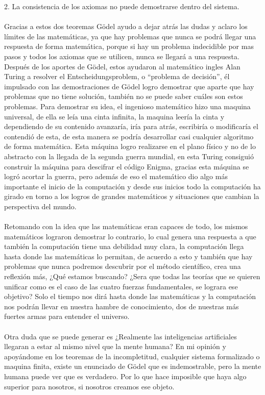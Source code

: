 \documentclass{article}
\begin{document}
2.	La consistencia de los axiomas no puede demostrarse dentro del sistema.\citep{3}\\\\
Gracias a estos dos teoremas Gödel ayudo a dejar atrás las dudas y aclaro los límites de las matemáticas, ya que hay problemas que nunca se podrá llegar una respuesta de forma matemática, porque si hay un problema indecidible por mas pasos y todos los axiomas que se utilicen, nunca se llegará a una respuesta.
Después de los aportes de Gödel, estos ayudaron al matemático ingles Alan Turing a resolver el Entscheidungsproblem, o “problema de decisión”, él impulsado con las demostraciones de Gödel logro demostrar que aparte que hay problemas que no tiene solución, también no se puede saber cuáles son estos problemas. Para demostrar su idea, el ingenioso matemático hizo una maquina universal, de ella se leía una cinta infinita, la maquina leería la cinta y dependiendo de su contenido avanzaría, iría para atrás, escribiría o modificaría el contendió de esta, de esta manera se podría desarrollar casi cualquier algoritmo de forma matemática. Esta máquina logro realizarse en el plano físico y no de lo abstracto con la llegada de la segunda guerra mundial, en esta Turing consiguió construir la máquina para descifrar el código Enigma, gracias esta máquina se logró acortar la guerra, pero además de eso el matemático dio algo más importante el inicio de la computación y desde sus inicios todo la computación ha girado en torno a los logros de grandes matemáticos y situaciones que cambian la perspectiva del mundo.\citep{4}\\\\
Retomando con la idea que las matemáticas eran capaces de todo, los mismos matemáticos lograron demostrar lo contrario, lo cual genera una respuesta a que también la computación tiene una debilidad muy clara, la computación llega hasta donde las matemáticas lo permitan, de acuerdo a esto y también que hay problemas que nunca podremos descubrir por el método científico, crea una reflexión más, ¿Qué estamos buscando? ¿Sera que todas las teorías que se quieren unificar como es el caso de las cuatro fuerzas fundamentales, se lograra ese objetivo? Solo el tiempo nos dirá hasta donde las matemáticas y la computación nos podrán llevar en nuestra hambre de conocimiento, dos de nuestras más fuertes armas para entender el universo.\\\\
Otra duda que se puede generar es ¿Realmente las inteligencias artificiales llegaran a estar al mismo nivel que la mente humana? En mi opinión y apoyándome en los teoremas de la incompletitud, cualquier sistema formalizado o maquina finita, existe un enunciado de Gödel que es indemostrable, pero la mente humana puede ver que es verdadero. Por lo que hace imposible que haya algo superior para nosotros, si nosotros creamos ese objeto.




\end{document}
